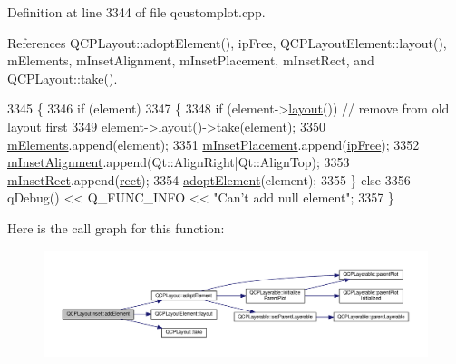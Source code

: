 Definition at line 3344 of file qcustomplot.\+cpp.



References Q\+C\+P\+Layout\+::adopt\+Element(), ip\+Free, Q\+C\+P\+Layout\+Element\+::layout(), m\+Elements, m\+Inset\+Alignment, m\+Inset\+Placement, m\+Inset\+Rect, and Q\+C\+P\+Layout\+::take().


\begin{DoxyCode}
3345 \{
3346   \textcolor{keywordflow}{if} (element)
3347   \{
3348     \textcolor{keywordflow}{if} (element->\hyperlink{class_q_c_p_layout_element_a6235f5384db871fc6e3387a1bc558b0d}{layout}()) \textcolor{comment}{// remove from old layout first}
3349       element->\hyperlink{class_q_c_p_layout_element_a6235f5384db871fc6e3387a1bc558b0d}{layout}()->\hyperlink{class_q_c_p_layout_ada26cd17e56472b0b4d7fbbc96873e4c}{take}(element);
3350     \hyperlink{class_q_c_p_layout_inset_a8fff7eae9a1be9a5c1e544fb379f682f}{mElements}.append(element);
3351     \hyperlink{class_q_c_p_layout_inset_a57a0a4e445cc78eada29765ecf092abe}{mInsetPlacement}.append(\hyperlink{class_q_c_p_layout_inset_a8b9e17d9a2768293d2a7d72f5e298192aa4802986ea2cea457f932b115acba59e}{ipFree});
3352     \hyperlink{class_q_c_p_layout_inset_a55e9b84c310136ff985a6544184ab64a}{mInsetAlignment}.append(Qt::AlignRight|Qt::AlignTop);
3353     \hyperlink{class_q_c_p_layout_inset_aaa8f6b5029458f3d97a65239524a2b33}{mInsetRect}.append(\hyperlink{class_q_c_p_layout_element_affdfea003469aac3d0fac5f4e06171bc}{rect});
3354     \hyperlink{class_q_c_p_layout_af6dbbc24156a808da29cd1ec031729a3}{adoptElement}(element);
3355   \} \textcolor{keywordflow}{else}
3356     qDebug() << Q\_FUNC\_INFO << \textcolor{stringliteral}{"Can't add null element"};
3357 \}
\end{DoxyCode}


Here is the call graph for this function\+:\nopagebreak
\begin{figure}[H]
\begin{center}
\leavevmode
\includegraphics[width=350pt]{class_q_c_p_layout_inset_a8ff61fbee4a1f0ff45c398009d9f1e56_cgraph}
\end{center}
\end{figure}


